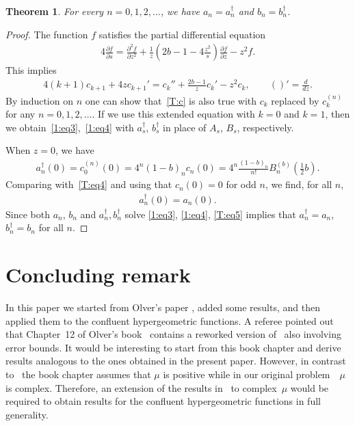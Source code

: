 \documentclass[pdftex]{sigma}
\numberwithin{equation}{section}
\newtheorem{Theorem}{Theorem}[section]
\begin{document}
\begin{Theorem}\label{T:t1}
For every $n=0,1,2,\dots$, we have $a_n=a_n^\dagger$ and $b_n=b_n^\dagger$.
\end{Theorem}

\begin{proof}
The function $f$ satisf\/ies the partial dif\/ferential equation
\begin{gather*} 4\frac{\partial f}{\partial s} =\frac{\partial^2f}{\partial z^2}+\frac1z\left(2b-1-4\frac{z^2}{s}\right)\frac{\partial f}{\partial z}-z^2 f.\end{gather*}
This implies
\begin{gather}\label{T:c}
 4(k+1)c_{k+1}+4zc_{k+1}'=c_k''+\frac{2b-1}{z} c_k'-z^2 c_k, \qquad ()'=\frac{d}{dz}.
\end{gather}
By induction on $n$ one can show that~\eqref{T:c} is also true with $c_k$ replaced by $c_k^{(n)}$ for any $n=0,1,2,\dots$.
If we use this extended equation with $k=0$ and $k=1$, then we obtain~\eqref{1:eq3},~\eqref{1:eq4} with $a_s^\dagger$, $b_s^\dagger$ in place of $A_s$, $B_s$, respectively.

When $z=0$, we have
\begin{gather*} a_n^\dagger(0)=c_0^{(n)}(0)=4^n(1-b)_n c_n(0)=4^n\frac{(1-b)_n}{n!} B_n^{(b)}\left(\frac12b\right) .\end{gather*}
Comparing with~\eqref{T:eq4} and using that $c_n(0)=0$ for odd $n$, we f\/ind, for all $n$,
\begin{gather}\label{T:eq5}
a_n^\dagger(0)=a_n(0).
\end{gather}
Since both $a_n$, $b_n$ and $a_n^\dagger, b_n^\dagger$ solve \eqref{1:eq3}, \eqref{1:eq4}, \eqref{T:eq5} implies that $a^\dagger_n=a_n$, $b^\dagger_n=b_n$ for all $n$.
\end{proof}

\section{Concluding remark}
In this paper we started from Olver's paper \cite{O}, added some results, and then applied them to the conf\/luent hypergeometric functions.
A referee pointed out that Chapter~12 of Olver's book~\cite{O2} contains a reworked version of~\cite{O} also involving error bounds.
It would be interesting to start from this book chapter and derive results analogous to the ones obtained in the present paper.
However, in contrast to~\cite{O} the book chapter assumes that $\mu$ is positive while in our original problem~\cite{C}~$\mu$ is complex.
Therefore, an extension of the results in~\cite[Chapter~12]{O2} to complex~$\mu$ would be required to obtain results for the conf\/luent hypergeometric
functions in full generality.
\end{document}
